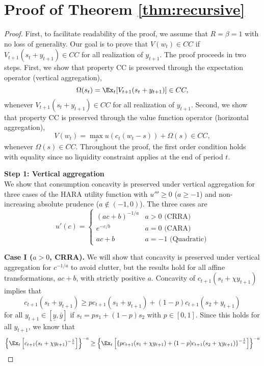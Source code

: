 \documentclass[titlepage]{\econtex}
\begin{document}
\section{Proof of Theorem \ref{thm:recursive}}\label{app:recursive}

\begin{proof}
	First, to facilitate readability of the proof, we assume that $R = \beta = 1$ with no loss of generality. Our goal is to prove that $V(w_t) \in CC$ if $V_{t+1}(s_t + {y}_{t+1}) \in CC$ for all realization of ${y}_{t+1}$. The proof proceeds in two steps. First, we show that property CC is preserved through the expectation operator (vertical aggregation),
	\[\Omega(s_t) = \Ex_t[V_{t+1}(s_t + {y}_{t+1})] \in CC,\]
	whenever $V_{t+1}(s_t + {y}_{t+1}) \in CC$ for all realization of ${y}_{t+1}$. Second, we show that property CC is preserved through the value function operator (horizontal aggregation),
	\[V(w_t) = \max_{s} u(c_t(w_t - s)) + \Omega(s) \in CC, \]
	whenever $\Omega(s) \in CC$. Throughout the proof, the first order condition holds with equality since no liquidity constraint applies at the end of period $t$. 
	
	\bigskip
	\noindent \textbf{Step 1: Vertical aggregation} \\ 
	\noindent We show that consumption concavity is preserved under vertical aggregation for three cases of the HARA utility function with $u''' \geq 0$ ($a \geq -1$) and non-increasing absolute prudence ($a \notin (-1,0)$). The three cases are
	\begin{equation}\label{eq:HARAmu}u'(c) = \begin{cases} \left(ac + b\right)^{-1/a} & a > 0 \text{ (CRRA)} \\
	e^{-c/b} & a = 0 \text{ (CARA)}\\
	ac + b & a = -1 \text{ (Quadratic)}\end{cases} \end{equation}
	
	\bigskip
	\noindent \textbf{Case I ($a > 0$, CRRA).} 	We will show that concavity is preserved under vertical aggregation for $c^{-1/a}$ to avoid clutter, but the results hold for all affine transformations, $ac + b$, with strictly positive $a$. Concavity of $c_{t+1}(s_t + \chi{y}_{t+1})$ implies that
	\begin{equation}c_{t+1}(s_t + {y}_{t+1}) \geq pc_{t+1}(s_1 + {y}_{t+1}) + (1-p) c_{t+1}(s_2 + {y}_{t+1}) \label{eq:vert_crra_conc}\end{equation}
	for all ${y}_{t+1} \in [\underline{y},\bar{y}]$ if $s_t = ps_1 + (1-p)s_2$ with $p \in [0,1]$. Since this holds for all ${y}_{t+1}$, we know that
	\[\left\{\Ex_t\left[c_{t+1}(s_t + \chi{y}_{t+1})^{-\frac{1}{a}}\right]\right\}^{-a} \geq \left\{\Ex_t\left[\left\{pc_{t+1}(s_1 + \chi{y}_{t+1}) + (1-p) c_{t+1}(s_2 + \chi{y}_{t+1})\right\}^{-\frac{1}{a}}\right]\right\}^{-a}\]
	

\end{proof}
\end{document}
